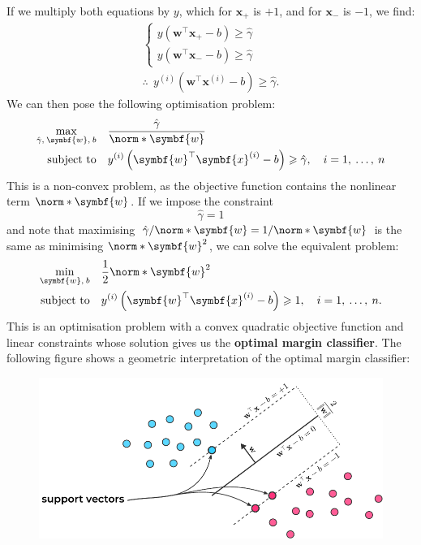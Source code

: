 \documentclass{article}
\begin{document}
If we multiply both equations by \(y\),
which for \(\symbf{x}_{{+}}\) is \({+}1\), and for \(\symbf{x}_{{-}}\)
is \({-}1\), we find:
\begin{gather*}
    \begin{cases}
        y \left( \symbf{w}^\top \symbf{x}_{{+}} - b \right) \geqslant \hat{\gamma} \\
        y \left( \symbf{w}^\top \symbf{x}_{{-}} - b \right) \geqslant \hat{\gamma}
    \end{cases}
    \\[1ex]
    \therefore\:\: y^{\left( i \right)} \left( \symbf{w}^\top \symbf{x}^{\left( i \right)} - b \right) \geqslant \hat{\gamma}.
\end{gather*}
We can then pose the following optimisation problem:
\begin{align*}
    \max_{\hat{\gamma},\: \symbf{w},\: b} \quad & \frac{\hat{\gamma}}{\norm*{\symbf{w}}}                                                                                                \\
    \text{subject to} \quad                     & y^{\left( i \right)} \left( \symbf{w}^\top \symbf{x}^{\left( i \right)} - b \right) \geqslant \hat{\gamma}, \quad i = 1,\: \dots,\: n
\end{align*}
This is a non-convex problem, as the objective function contains the
nonlinear term \(\norm*{\symbf{w}}\). If we impose the constraint
\begin{equation*}
    \hat{\gamma} = 1
\end{equation*}
and note that maximising \(\hat{\gamma} / \norm*{\symbf{w}} = 1 / \norm*{\symbf{w}}\)
is the same as minimising \(\norm*{\symbf{w}}^2\), we can solve the
equivalent problem:
\begin{align*}
    \min_{\symbf{w},\: b} \quad & \frac{1}{2}\norm*{\symbf{w}}^2                                                                                              \\
    \text{subject to} \quad     & y^{\left( i \right)} \left( \symbf{w}^\top \symbf{x}^{\left( i \right)} - b \right) \geqslant 1, \quad i = 1,\: \dots,\: n.
\end{align*}
This is an optimisation problem with a convex quadratic objective
function and linear constraints whose solution gives us the
\textbf{optimal margin classifier}. The following figure shows a
geometric interpretation of the optimal margin classifier:
\begin{figure}[H]
    \centering
    \includegraphics[width = \linewidth]{figures/hard_margin_svm.pdf}
\end{figure}
\end{document}
